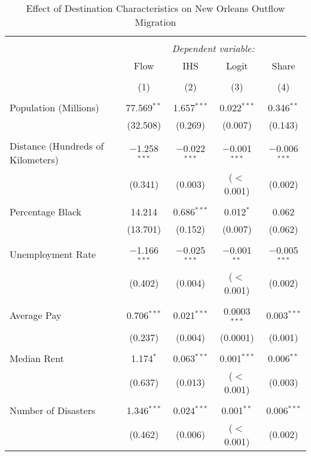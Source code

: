 \documentclass[]{article}
\begin{document}
\clearpage
\scriptsize

\begin{table}[!htbp] \centering 
  \caption{\label{reg:regmainr}Effect of Destination Characteristics on New Orleans Outflow Migration} 
  \label{} 
\scriptsize 
\begin{tabular}{@{\extracolsep{5pt}}lcccc} 
\\[-1.8ex]\hline 
\hline \\[-1.8ex] 
 & \multicolumn{4}{c}{\textit{Dependent variable:}} \\ 
\cline{2-5} 
 & Flow & IHS & Logit & Share \\ 
\\[-1.8ex] & (1) & (2) & (3) & (4)\\ 
\hline \\[-1.8ex] 
 Population (Millions) & 77.569$^{**}$ & 1.657$^{***}$ & 0.022$^{***}$ & 0.346$^{**}$ \\ 
  & (32.508) & (0.269) & (0.007) & (0.143) \\ 
  & & & & \\ 
 Distance (Hundreds of Kilometers) & $-$1.258$^{***}$ & $-$0.022$^{***}$ & $-$0.001$^{***}$ & $-$0.006$^{***}$ \\ 
  & (0.341) & (0.003) & ($<$0.001) & (0.002) \\ 
  & & & & \\ 
 Percentage Black & 14.214 & 0.686$^{***}$ & 0.012$^{*}$ & 0.062 \\ 
  & (13.701) & (0.152) & (0.007) & (0.062) \\ 
  & & & & \\ 
 Unemployment Rate & $-$1.166$^{***}$ & $-$0.025$^{***}$ & $-$0.001$^{**}$ & $-$0.005$^{***}$ \\ 
  & (0.402) & (0.004) & ($<$0.001) & (0.002) \\ 
  & & & & \\ 
 Average Pay & 0.706$^{***}$ & 0.021$^{***}$ & 0.0003$^{***}$ & 0.003$^{***}$ \\ 
  & (0.237) & (0.004) & (0.0001) & (0.001) \\ 
  & & & & \\ 
 Median Rent & 1.174$^{*}$ & 0.063$^{***}$ & 0.001$^{***}$ & 0.006$^{**}$ \\ 
  & (0.637) & (0.013) & ($<$0.001) & (0.003) \\ 
  & & & & \\ 
 Number of Disasters & 1.346$^{***}$ & 0.024$^{***}$ & 0.001$^{**}$ & 0.006$^{***}$ \\ 
  & (0.462) & (0.006) & ($<$0.001) & (0.002) \\ 

\end{tabular}
\end{table}
\end{document}
